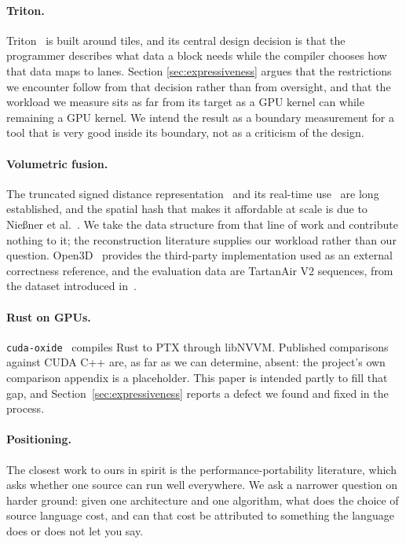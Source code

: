 \documentclass[11pt]{article}
\begin{document}
\paragraph{Triton.} Triton~\cite{tillet2019triton} is built around tiles, and its
central design decision is that the programmer describes what data a block needs
while the compiler chooses how that data maps to lanes. Section
\ref{sec:expressiveness} argues that the restrictions we encounter follow from
that decision rather than from oversight, and that the workload we measure sits
as far from its target as a GPU kernel can while remaining a GPU kernel. We
intend the result as a boundary measurement for a tool that is very good inside
its boundary, not as a criticism of the design.

\paragraph{Volumetric fusion.} The truncated signed distance
representation~\cite{curless1996volumetric} and its real-time
use~\cite{newcombe2011kinectfusion} are long established, and the spatial hash
that makes it affordable at scale is due to Nie{\ss}ner et
al.~\cite{niessner2013voxelhashing}. We take the data structure from that line of
work and contribute nothing to it; the reconstruction literature supplies our
workload rather than our question. Open3D~\cite{zhou2018open3d} provides the
third-party implementation used as an external correctness reference, and the
evaluation data are TartanAir V2 sequences, from the dataset introduced
in~\cite{wang2020tartanair}.

\paragraph{Rust on GPUs.} \texttt{cuda-oxide}~\cite{cudaoxide} compiles Rust to
PTX through libNVVM. Published comparisons against CUDA C++ are, as far as we can
determine, absent: the project's own comparison appendix is a placeholder. This
paper is intended partly to fill that gap, and Section~\ref{sec:expressiveness}
reports a defect we found and fixed in the process.

\paragraph{Positioning.} The closest work to ours in spirit is the
performance-portability literature, which asks whether one source can run well
everywhere. We ask a narrower question on harder ground: given one architecture
and one algorithm, what does the choice of source language cost, and can that
cost be attributed to something the language does or does not let you say.
\end{document}
